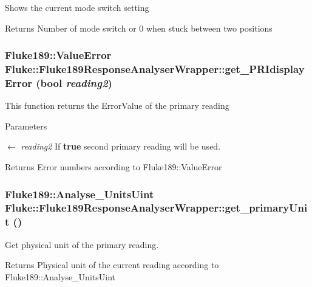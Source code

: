 \label{classFluke_1_1Fluke189ResponseAnalyserWrapper_ab9c2c45e6a6b8b2d0b89c8c5bab0c110}
Shows the current mode switch setting \begin{DoxyReturn}{Returns}
Number of mode switch or 0 when stuck between two positions 
\end{DoxyReturn}
\hypertarget{classFluke_1_1Fluke189ResponseAnalyserWrapper_a8e83974e8215911b422c7d6bde35437e}{
\subsubsection[{get\_\-PRIdisplayError}]{\setlength{\rightskip}{0pt plus 5cm}Fluke189::ValueError Fluke::Fluke189ResponseAnalyserWrapper::get\_\-PRIdisplayError (bool {\em reading2})}}
\label{classFluke_1_1Fluke189ResponseAnalyserWrapper_a8e83974e8215911b422c7d6bde35437e}
This function returns the ErrorValue of the primary reading 
\begin{DoxyParams}{Parameters}
\item[\mbox{$\leftarrow$} {\em reading2}]If {\bfseries true} second primary reading will be used. \end{DoxyParams}
\begin{DoxyReturn}{Returns}
Error numbers according to Fluke189::ValueError 
\end{DoxyReturn}
\hypertarget{classFluke_1_1Fluke189ResponseAnalyserWrapper_a6bea7010b65b43abe8918fdfeccf3dca}{
\subsubsection[{get\_\-primaryUnit}]{\setlength{\rightskip}{0pt plus 5cm}Fluke189::Analyse\_\-UnitsUint Fluke::Fluke189ResponseAnalyserWrapper::get\_\-primaryUnit ()}}
\label{classFluke_1_1Fluke189ResponseAnalyserWrapper_a6bea7010b65b43abe8918fdfeccf3dca}
Get physical unit of the primary reading. \begin{DoxyReturn}{Returns}
Physical unit of the current reading according to Fluke189::Analyse\_\-UnitsUint 
\end{DoxyReturn}

